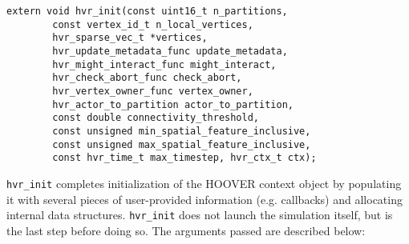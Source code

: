 \begin{verbatim}
extern void hvr_init(const uint16_t n_partitions,
        const vertex_id_t n_local_vertices,
        hvr_sparse_vec_t *vertices,
        hvr_update_metadata_func update_metadata,
        hvr_might_interact_func might_interact,
        hvr_check_abort_func check_abort,
        hvr_vertex_owner_func vertex_owner,
        hvr_actor_to_partition actor_to_partition,
        const double connectivity_threshold,
        const unsigned min_spatial_feature_inclusive,
        const unsigned max_spatial_feature_inclusive,
        const hvr_time_t max_timestep, hvr_ctx_t ctx);
\end{verbatim}

\texttt{hvr\_init} completes initialization of the HOOVER context object by
populating it with several pieces of user-provided information (e.g. callbacks)
and allocating internal data structures. \texttt{hvr\_init} does not launch the
simulation itself, but is the last step before doing so. The arguments passed
are described below:

